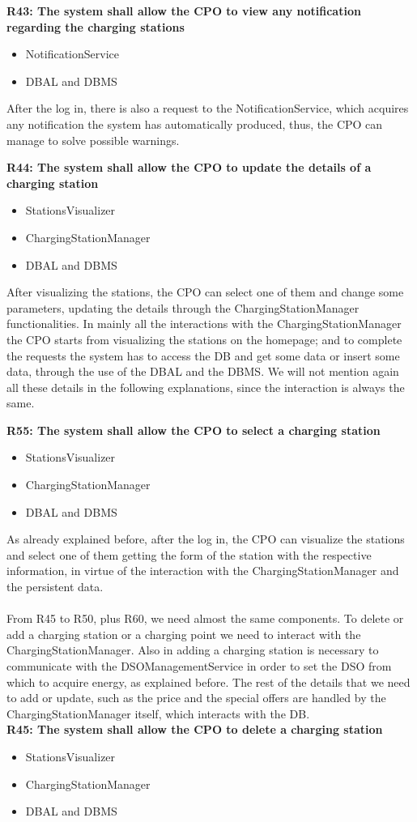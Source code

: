 \textbf{R43: The system shall allow the CPO to view any notification regarding the charging stations}
\begin{itemize}
    \item NotificationService
    \item DBAL and DBMS
\end{itemize}
After the log in, there is also a request to the NotificationService, which acquires any notification the system has automatically produced, thus, the CPO can manage to solve possible warnings.

\textbf{R44: The system shall allow the CPO to update the details of a charging station}
\begin{itemize}
    \item StationsVisualizer
    \item ChargingStationManager
    \item DBAL and DBMS
\end{itemize}
After visualizing the stations, the CPO can select one of them and change some parameters, updating the details through the ChargingStationManager functionalities. In mainly all the interactions with the ChargingStationManager the CPO starts from visualizing the stations on the homepage; and to complete the requests the system has to access the DB and get some data or insert some data, through the use of the DBAL and the DBMS. We will not mention again all these details in the following explanations, since the interaction is always the same.

\textbf{R55: The system shall allow the CPO to select a charging station}
\begin{itemize}
    \item StationsVisualizer
    \item ChargingStationManager
    \item DBAL and DBMS
\end{itemize}
As already explained before, after the log in, the CPO can visualize the stations and select one of them getting the form of the station with the respective information, in virtue of the interaction with the ChargingStationManager and the persistent data.\\
\\

From R45 to R50, plus R60, we need almost the same components. To delete or add a charging station or a charging point we need to interact with the ChargingStationManager. Also in adding a charging station is necessary to communicate with the DSOManagementService in order to set the DSO from which to acquire energy, as explained before. The rest of the details that we need to add or update, such as the price and the special offers are handled by the ChargingStationManager itself, which interacts with the DB. \\
\textbf{R45: The system shall allow the CPO to delete a charging station }
\begin{itemize}
    \item StationsVisualizer
    \item ChargingStationManager
    \item DBAL and DBMS
\end{itemize}

